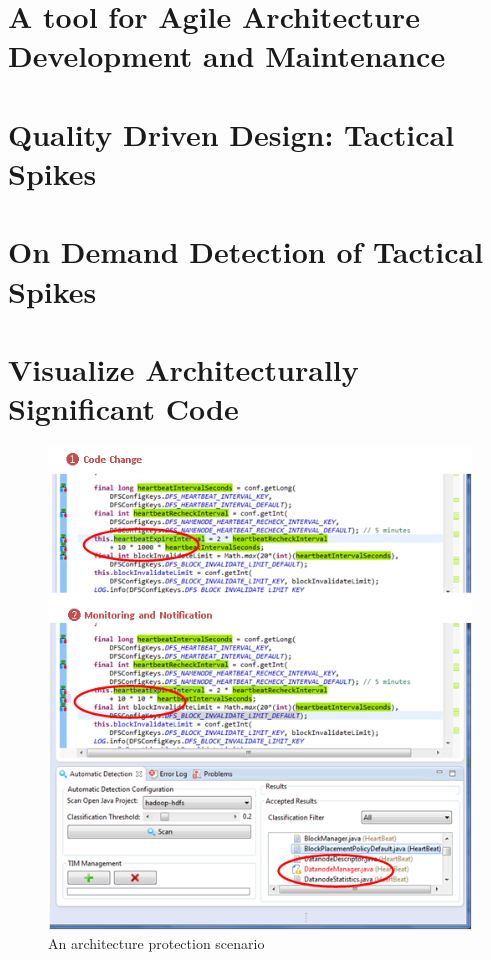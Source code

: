 \documentclass[lnbip]{svmultln}
\begin{document}
\section{A tool for Agile Architecture Development and Maintenance}



\section{Quality Driven Design: Tactical Spikes}







\section{On Demand Detection of Tactical Spikes}


\section{Visualize Architecturally Significant Code}




\begin{figure}[!t]
\centering
\includegraphics[width=0.99\linewidth]{./Monitoring}
\caption{An architecture protection scenario}
\label{fig:Monitoring}
\vspace{-16pt}
\end{figure}
\end{document}

